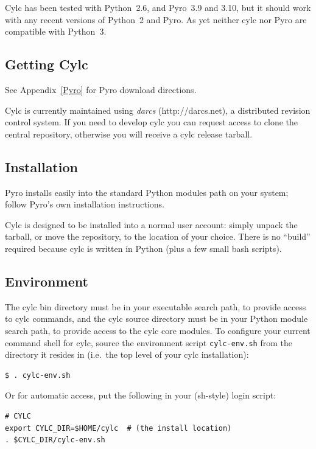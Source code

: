 \documentclass[11pt,a4paper]{article}
\begin{document}
Cylc has been tested with Python~2.6, and Pyro~3.9 and 3.10,
but it should work with any recent versions of Python~2 and Pyro.
As yet neither cylc nor Pyro are compatible with Python~3. 

\subsection{Getting Cylc} 
\label{GettingCylc}

See Appendix~\ref{Pyro} for Pyro download directions.

Cylc is currently maintained using {\em darcs} (http://darcs.net), a
distributed revision control system. If you need to develop cylc you can
request access to clone the central repository, otherwise you will
receive a cylc release tarball. 

\subsection{Installation} 
\label{Installation}

Pyro installs easily into the standard Python modules path on your
system; follow Pyro's own installation instructions.

Cylc is designed to be installed into a normal user account: simply
unpack the tarball, or move the repository, to the location of your
choice. There is no ``build'' required because cylc is written in Python
(plus a few small bash scripts).

\subsection{Environment} 
\label{Environment}

\lstset{language=bash} 

The cylc bin directory must be in your executable search path, to
provide access to cylc commands, and the cylc source directory must be
in your Python module search path, to provide access to the cylc core
modules. To configure your current command shell for cylc, source 
the environment script \lstinline=cylc-env.sh= from the directory it
resides in (i.e.\ the top level of your cylc installation):

\begin{lstlisting}
$ . cylc-env.sh
\end{lstlisting}

Or for automatic access, put the following in your (sh-style) login
script:

\begin{lstlisting}
# CYLC
export CYLC_DIR=$HOME/cylc  # (the install location)
. $CYLC_DIR/cylc-env.sh
\end{lstlisting}
\end{document}
